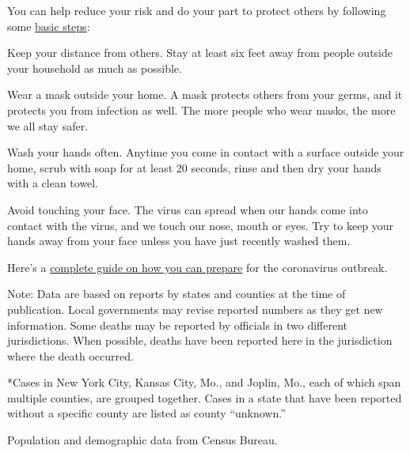 You can help reduce your risk and do your part to protect others by
following some
\href{https://www.nytimes.com/article/prepare-for-coronavirus.html}{basic
steps}:

Keep your distance from others. Stay at least six feet away from people
outside your household as much as possible.

Wear a mask outside your home. A mask protects others from your germs,
and it protects you from infection as well. The more people who wear
masks, the more we all stay safer.

Wash your hands often. Anytime you come in contact with a surface
outside your home, scrub with soap for at least 20 seconds, rinse and
then dry your hands with a clean towel.

Avoid touching your face. The virus can spread when our hands come into
contact with the virus, and we touch our nose, mouth or eyes. Try to
keep your hands away from your face unless you have just recently washed
them.

Here's a
\href{https://www.nytimes.com/interactive/2020/world/coronavirus-tips-advice.html}{complete
guide on how you can prepare} for the coronavirus outbreak.

Note: Data are based on reports by states and counties at the time of
publication. Local governments may revise reported numbers as they get
new information. Some deaths may be reported by officials in two
different jurisdictions. When possible, deaths have been reported here
in the jurisdiction where the death occurred.

*Cases in New York City, Kansas City, Mo., and Joplin, Mo., each of
which span multiple counties, are grouped together. Cases in a state
that have been reported without a specific county are listed as county
``unknown.''

Population and demographic data from Census Bureau.

